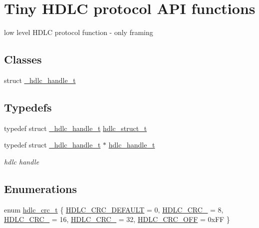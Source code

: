 \hypertarget{group__HDLC__API}{}\section{Tiny H\+D\+LC protocol A\+PI functions}
\label{group__HDLC__API}


low level H\+D\+LC protocol function -\/ only framing  


\subsection*{Classes}
\begin{DoxyCompactItemize}
\item 
struct \hyperlink{struct__hdlc__handle__t}{\+\_\+hdlc\+\_\+handle\+\_\+t}
\end{DoxyCompactItemize}
\subsection*{Typedefs}
\begin{DoxyCompactItemize}
\item 
typedef struct \hyperlink{struct__hdlc__handle__t}{\+\_\+hdlc\+\_\+handle\+\_\+t} \hyperlink{group__HDLC__API_ga4537a8665b2abe023cb7fe40ea1bd024}{hdlc\+\_\+struct\+\_\+t}
\item 
\mbox{\label{group__HDLC__API_gabeaf7578aed5279d3af891bd85a9f961}} 
typedef struct \hyperlink{struct__hdlc__handle__t}{\+\_\+hdlc\+\_\+handle\+\_\+t} $\ast$ \hyperlink{group__HDLC__API_gabeaf7578aed5279d3af891bd85a9f961}{hdlc\+\_\+handle\+\_\+t}
\begin{DoxyCompactList}\small\item\em hdlc handle \end{DoxyCompactList}\end{DoxyCompactItemize}
\subsection*{Enumerations}
\begin{DoxyCompactItemize}
\item 
enum \hyperlink{group__HDLC__API_gabb73b32d08d8e79eefe9385634a74bf7}{hdlc\+\_\+crc\+\_\+t} \{ \newline
\hyperlink{group__HDLC__API_ggabb73b32d08d8e79eefe9385634a74bf7a5f34a095f94c39357e31badd2feb9426}{H\+D\+L\+C\+\_\+\+C\+R\+C\+\_\+\+D\+E\+F\+A\+U\+LT} = 0, 
\hyperlink{group__HDLC__API_ggabb73b32d08d8e79eefe9385634a74bf7a01bc9e3bb4df100ae74bd65e33223a10}{H\+D\+L\+C\+\_\+\+C\+R\+C\+\_} = 8, 
\hyperlink{group__HDLC__API_ggabb73b32d08d8e79eefe9385634a74bf7a7ee7be32ac5752572334f3c6bc6fa5a1}{H\+D\+L\+C\+\_\+\+C\+R\+C\+\_} = 16, 
\hyperlink{group__HDLC__API_ggabb73b32d08d8e79eefe9385634a74bf7a77c7dfdc97801651d98b6c4eb79882d3}{H\+D\+L\+C\+\_\+\+C\+R\+C\+\_} = 32, 
\newline
\hyperlink{group__HDLC__API_ggabb73b32d08d8e79eefe9385634a74bf7a6ed874f871614e9de6358d678256a140}{H\+D\+L\+C\+\_\+\+C\+R\+C\+\_\+\+O\+FF} = 0x\+FF
 \}
\end{DoxyCompactItemize}

